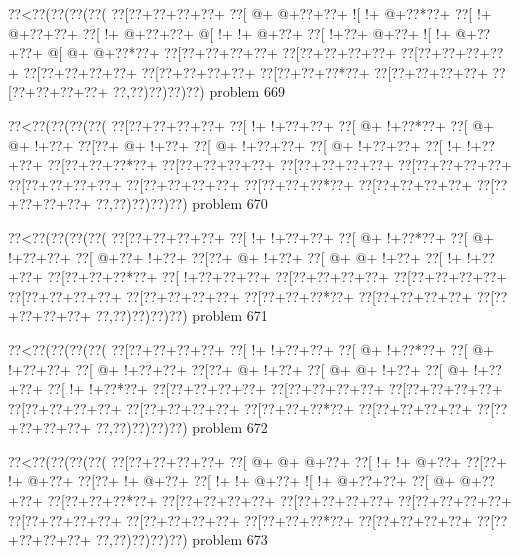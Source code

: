\vbox{\vbox{\goo
\0??<\0??(\0??(\0??(\0??(
\0??[\0??+\0??+\0??+\0??+
\0??[\- @+\- @+\0??+\0??+
\- ![\- !+\- @+\0??*\0??+
\0??[\- !+\- @+\0??+\0??+
\0??[\- !+\- @+\0??+\0??+
\- @[\- !+\- !+\- @+\0??+
\0??[\- !+\0??+\- @+\0??+
\- ![\- !+\- @+\0??+\0??+
\- @[\- @+\- @+\0??*\0??+
\0??[\0??+\0??+\0??+\0??+
\0??[\0??+\0??+\0??+\0??+
\0??[\0??+\0??+\0??+\0??+
\0??[\0??+\0??+\0??+\0??+
\0??[\0??+\0??+\0??+\0??+
\0??[\0??+\0??+\0??*\0??+
\0??[\0??+\0??+\0??+\0??+
\0??[\0??+\0??+\0??+\0??+
\0??,\0??)\0??)\0??)\0??)
}
\hfil problem 669\hfil\break
}

\vbox{\vbox{\goo
\0??<\0??(\0??(\0??(\0??(
\0??[\0??+\0??+\0??+\0??+
\0??[\- !+\- !+\0??+\0??+
\0??[\- @+\- !+\0??*\0??+
\0??[\- @+\- @+\- !+\0??+
\0??[\0??+\- @+\- !+\0??+
\0??[\- @+\- !+\0??+\0??+
\0??[\- @+\- !+\0??+\0??+
\0??[\- !+\- !+\0??+\0??+
\0??[\0??+\0??+\0??*\0??+
\0??[\0??+\0??+\0??+\0??+
\0??[\0??+\0??+\0??+\0??+
\0??[\0??+\0??+\0??+\0??+
\0??[\0??+\0??+\0??+\0??+
\0??[\0??+\0??+\0??+\0??+
\0??[\0??+\0??+\0??*\0??+
\0??[\0??+\0??+\0??+\0??+
\0??[\0??+\0??+\0??+\0??+
\0??,\0??)\0??)\0??)\0??)
}
\hfil problem 670\hfil\break
}

\vbox{\vbox{\goo
\0??<\0??(\0??(\0??(\0??(
\0??[\0??+\0??+\0??+\0??+
\0??[\- !+\- !+\0??+\0??+
\0??[\- @+\- !+\0??*\0??+
\0??[\- @+\- !+\0??+\0??+
\0??[\- @+\0??+\- !+\0??+
\0??[\0??+\- @+\- !+\0??+
\0??[\- @+\- @+\- !+\0??+
\0??[\- !+\- !+\0??+\0??+
\0??[\0??+\0??+\0??*\0??+
\0??[\- !+\0??+\0??+\0??+
\0??[\0??+\0??+\0??+\0??+
\0??[\0??+\0??+\0??+\0??+
\0??[\0??+\0??+\0??+\0??+
\0??[\0??+\0??+\0??+\0??+
\0??[\0??+\0??+\0??*\0??+
\0??[\0??+\0??+\0??+\0??+
\0??[\0??+\0??+\0??+\0??+
\0??,\0??)\0??)\0??)\0??)
}
\hfil problem 671\hfil\break
}

\vbox{\vbox{\goo
\0??<\0??(\0??(\0??(\0??(
\0??[\0??+\0??+\0??+\0??+
\0??[\- !+\- !+\0??+\0??+
\0??[\- @+\- !+\0??*\0??+
\0??[\- @+\- !+\0??+\0??+
\0??[\- @+\- !+\0??+\0??+
\0??[\0??+\- @+\- !+\0??+
\0??[\- @+\- @+\- !+\0??+
\0??[\- @+\- !+\0??+\0??+
\0??[\- !+\- !+\0??*\0??+
\0??[\0??+\0??+\0??+\0??+
\0??[\0??+\0??+\0??+\0??+
\0??[\0??+\0??+\0??+\0??+
\0??[\0??+\0??+\0??+\0??+
\0??[\0??+\0??+\0??+\0??+
\0??[\0??+\0??+\0??*\0??+
\0??[\0??+\0??+\0??+\0??+
\0??[\0??+\0??+\0??+\0??+
\0??,\0??)\0??)\0??)\0??)
}
\hfil problem 672\hfil\break
}

\vbox{\vbox{\goo
\0??<\0??(\0??(\0??(\0??(
\0??[\0??+\0??+\0??+\0??+
\0??[\- @+\- @+\- @+\0??+
\0??[\- !+\- !+\- @+\0??+
\0??[\0??+\- !+\- @+\0??+
\0??[\0??+\- !+\- @+\0??+
\0??[\- !+\- !+\- @+\0??+
\- ![\- !+\- @+\0??+\0??+
\0??[\- @+\- @+\0??+\0??+
\0??[\0??+\0??+\0??*\0??+
\0??[\0??+\0??+\0??+\0??+
\0??[\0??+\0??+\0??+\0??+
\0??[\0??+\0??+\0??+\0??+
\0??[\0??+\0??+\0??+\0??+
\0??[\0??+\0??+\0??+\0??+
\0??[\0??+\0??+\0??*\0??+
\0??[\0??+\0??+\0??+\0??+
\0??[\0??+\0??+\0??+\0??+
\0??,\0??)\0??)\0??)\0??)
}
\hfil problem 673\hfil\break
}


